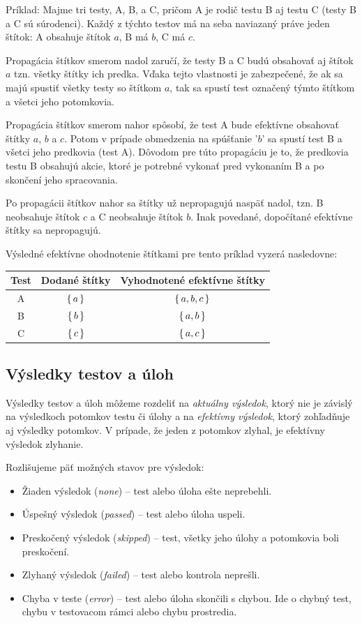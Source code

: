 \documentclass[
  digital, %
  oneside, %
  table,   %
  lof,     %
  lot,   %
]{fithesis3}
\begin{document}
Príklad: Majme tri testy, A, B, a C, pričom A je rodič testu B aj testu C (testy B a C sú súrodenci). Každý z týchto testov má na seba naviazaný práve jeden štítok: A obsahuje štítok $a$, B má $b$, C má $c$. 

Propagácia štítkov smerom nadol zaručí, že testy B a C budú obsahovať aj štítok $a$ tzn. všetky štítky ich predka. Vďaka tejto vlastnosti je zabezpečené, že ak sa majú spustiť všetky testy so štítkom $a$, tak sa spustí test označený týmto štítkom a všetci jeho potomkovia.

Propagácia štítkov smerom nahor spôsobí, že test A bude efektívne obsahovať štítky $a$, $b$ a $c$. Potom v prípade obmedzenia na spúšťanie '$b$' sa spustí test B a všetci jeho predkovia (test A). Dôvodom pre túto propagáciu je to, že predkovia testu B obsahujú akcie, ktoré je potrebné vykonať pred vykonaním B a po skončení jeho spracovania.

Po propagácii štítkov nahor sa štítky už nepropagujú naspäť nadol, tzn. B neobsahuje štítok $c$ a C neobsahuje štítok $b$. Inak povedané, dopočítané efektívne štítky sa nepropagujú.

Výsledné efektívne ohodnotenie štítkami pre tento príklad vyzerá nasledovne:
\begin{table}[h]
\begin{tabular}{c c c}
Test & Dodané štítky & Vyhodnotené efektívne štítky  \\ [0.5ex] 
\hline
A & $\set{a}$ & $\set{a,b,c}$ \\
B & $\set{b}$ & $\set{a,b}$   \\
C & $\set{c}$ & $\set{a,c}$   \\
\end{tabular}
\end{table}


\subsection{Výsledky testov a úloh}

Výsledky testov a úloh môžeme rozdeliť na \emph{aktuálny výsledok}, ktorý nie je závislý na výsledkoch potomkov testu či úlohy a na \emph{efektívny výsledok}, ktorý zohľadňuje aj výsledky potomkov. V prípade, že jeden z potomkov zlyhal, je efektívny výsledok zlyhanie.

Rozlišujeme päť možných stavov pre výsledok:
\begin{itemize}
    \item Žiaden výsledok (\emph{none}) -- test alebo úloha ešte neprebehli.
    \item Úspešný výsledok (\emph{passed}) -- test alebo úloha uspeli.
    \item Preskočený výsledok (\emph{skipped}) -- test, všetky jeho úlohy a potomkovia boli preskočení.
    \item Zlyhaný výsledok (\emph{failed}) -- test alebo kontrola neprešli.
    \item Chyba v teste (\emph{error}) -- test alebo úloha skončili s chybou. Ide o chybný test, chybu v testovacom rámci alebo chybu prostredia.
\end{itemize}
\end{document}
